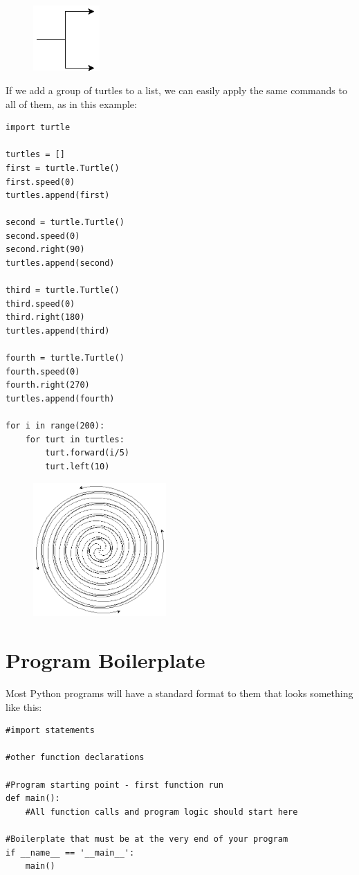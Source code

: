 \documentclass[11pt]{cselabheader}
\begin{document}
\begin{figure}[h]
  \centering
  \includegraphics[width=1.0in]{img/turtle_prong}
\end{figure}

If we add a group of turtles to a list, we can easily apply the same commands to all of them, as in this example:

\begin{lstlisting}[style=python]
import turtle

turtles = []
first = turtle.Turtle()
first.speed(0)
turtles.append(first)

second = turtle.Turtle()
second.speed(0)
second.right(90)
turtles.append(second)

third = turtle.Turtle()
third.speed(0)
third.right(180)
turtles.append(third)

fourth = turtle.Turtle()
fourth.speed(0)
fourth.right(270)
turtles.append(fourth)

for i in range(200):
    for turt in turtles:
        turt.forward(i/5)
        turt.left(10)
\end{lstlisting}

\begin{figure}[h]
  \centering
  \includegraphics[width=2.0in]{img/fancy_spiral}
\end{figure}

\pagebreak
\section{Program Boilerplate}
\label{sec:boil}

Most Python programs will have a standard format to them that looks something like this:

\begin{lstlisting}[style=python]
#import statements

#other function declarations

#Program starting point - first function run
def main():
    #All function calls and program logic should start here

#Boilerplate that must be at the very end of your program
if __name__ == '__main__':
    main()
\end{lstlisting}
\end{document}
